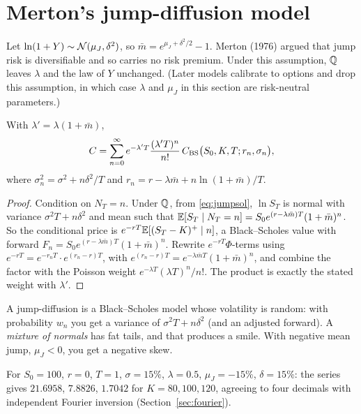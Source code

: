 \section{Merton's jump-diffusion model}\label{sec:merton}

Let $\ln(1+Y)\sim\mathcal{N}(\mu_J,\delta^2)$, so $\bar m=e^{\mu_J+\delta^2/2}-1$. Merton (1976) argued that jump risk is diversifiable and so carries no risk premium. Under this assumption, $\mathbb{Q}$ leaves $\lambda$ and the law of $Y$ unchanged. (Later models calibrate to options and drop this assumption, in which case $\lambda$ and $\mu_J$ in this section are risk-neutral parameters.)

\begin{theorem}\label{thm:merton}
With $\lambda'=\lambda(1+\bar m)$,
\[
C=\sum_{n=0}^\infty e^{-\lambda'T}\frac{(\lambda'T)^n}{n!}\,C_{\rm BS}\bigl(S_0,K,T;r_n,\sigma_n\bigr),
\]
where $\sigma_n^2=\sigma^2+n\delta^2/T$ and $r_n=r-\lambda\bar m+n\ln(1+\bar m)/T$.
\end{theorem}
\begin{proof}
Condition on $N_T=n$. Under $\mathbb{Q}$, from \eqref{eq:jumpsol}, $\ln S_T$ is normal with variance $\sigma^2T+n\delta^2$ and mean such that $\mathbb{E}[S_T\mid N_T=n]=S_0e^{(r-\lambda\bar m)T}(1+\bar m)^n$. So the conditional price is $e^{-rT}\mathbb{E}[(S_T-K)^+\mid n]$, a Black--Scholes value with forward $F_n=S_0e^{(r-\lambda\bar m)T}(1+\bar m)^n$. Rewrite $e^{-rT}\Phi$-terms using $e^{-rT}=e^{-r_nT}\cdot e^{(r_n-r)T}$, with $e^{(r_n-r)T}=e^{-\lambda\bar mT}(1+\bar m)^n$, and combine the factor with the Poisson weight $e^{-\lambda T}(\lambda T)^n/n!$. The product is exactly the stated weight with $\lambda'$.
\end{proof}

\begin{intuition}
A jump-diffusion is a Black--Scholes model whose volatility is random: with probability $w_n$ you get a variance of $\sigma^2T+n\delta^2$ (and an adjusted forward). A \emph{mixture of normals} has fat tails, and that produces a smile. With negative mean jump, $\mu_J<0$, you get a negative skew.
\end{intuition}

\begin{numcheck}
For $S_0=100$, $r=0$, $T=1$, $\sigma=15\%$, $\lambda=0.5$, $\mu_J=-15\%$, $\delta=15\%$: the series gives $21.6958$, $7.8826$, $1.7042$ for $K=80,100,120$, agreeing to four decimals with independent Fourier inversion (Section~\ref{sec:fourier}).
\end{numcheck}

